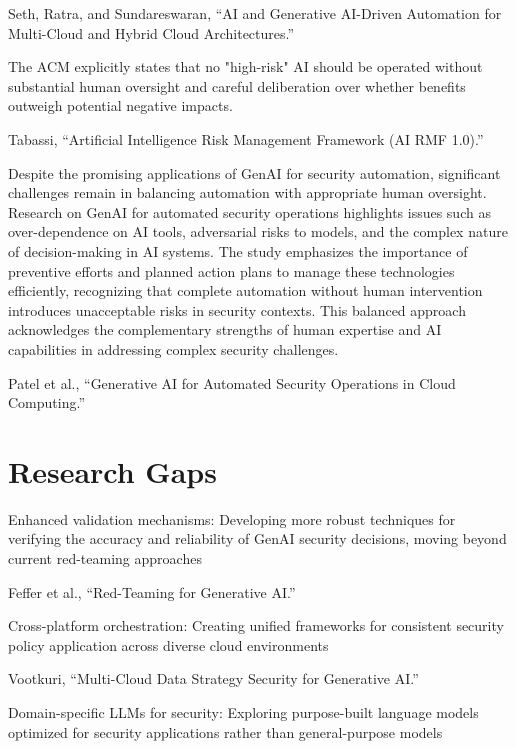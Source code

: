 Seth, Ratra, and Sundareswaran, “AI and Generative AI-Driven Automation for Multi-Cloud and Hybrid Cloud Architectures.”

The ACM explicitly states that no "high-risk" AI should be operated without substantial human oversight and careful deliberation over whether benefits outweigh potential negative impacts.

Tabassi, “Artificial Intelligence Risk Management Framework (AI RMF 1.0).”

Despite the promising applications of GenAI for security automation, significant challenges remain in balancing automation with appropriate human oversight. Research on GenAI for automated security operations highlights issues such as over-dependence on AI tools, adversarial risks to models, and the complex nature of decision-making in AI systems.
The study emphasizes the importance of preventive efforts and planned action plans to manage these technologies efficiently, recognizing that complete automation without human intervention introduces unacceptable risks in security contexts. This balanced approach acknowledges the complementary strengths of human expertise and AI capabilities in addressing complex security challenges.

Patel et al., “Generative AI for Automated Security Operations in Cloud Computing.”



\section{Research Gaps} %
\label{sec:Research Gaps}

Enhanced validation mechanisms: Developing more robust techniques for verifying the accuracy and reliability of GenAI security decisions, moving beyond current red-teaming approaches

Feffer et al., “Red-Teaming for Generative AI.”

Cross-platform orchestration: Creating unified frameworks for consistent security policy application across diverse cloud environments

Vootkuri, “Multi-Cloud Data Strategy Security for Generative AI.”

Domain-specific LLMs for security: Exploring purpose-built language models optimized for security applications rather than general-purpose models

